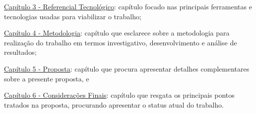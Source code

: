 \hyperref[chap:ReferencialTecnologico]{Capítulo 3 - Referencial Tecnológico}: capítulo focado nas principais ferramentas e tecnologias usadas para viabilizar o trabalho;

\hyperref[chap:Metodologia]{Capítulo 4 - Metodologia}: capítulo que esclarece sobre a metodologia para realização do trabalho em termos investigativo, desenvolvimento e análise de resultados;

\hyperref[chap:Proposta]{Capítulo 5 - Proposta}: capítulo que procura apresentar detalhes complementares sobre a presente proposta, e

\hyperref[chap:ConsideracoesFinais]{Capítulo 6 - Considerações Finais}: capítulo que resgata os principais pontos tratados na proposta, procurando apresentar o status atual do trabalho.